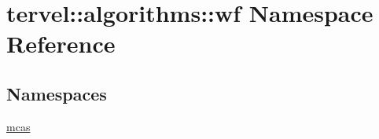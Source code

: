 \hypertarget{namespacetervel_1_1algorithms_1_1wf}{}\section{tervel\+:\+:algorithms\+:\+:wf Namespace Reference}
\label{namespacetervel_1_1algorithms_1_1wf}
\subsection*{Namespaces}
\begin{DoxyCompactItemize}
\item 
 \hyperlink{namespacetervel_1_1algorithms_1_1wf_1_1mcas}{mcas}
\end{DoxyCompactItemize}
